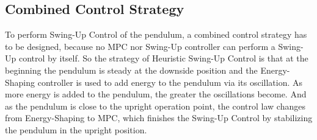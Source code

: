 \subsection{Combined Control Strategy}
To perform Swing-Up Control of the pendulum, a combined control strategy has to be designed, because no MPC nor Swing-Up controller can perform a Swing-Up control by itself. So the strategy of Heuristic Swing-Up Control is that at the beginning the pendulum is steady at the downside position and the Energy-Shaping controller is used to add energy to the pendulum via its oscillation. As more energy is added to the pendulum, the greater the oscillations become. And as the pendulum is close to the upright operation point, the control law changes from Energy-Shaping to MPC, which finishes the Swing-Up Control by stabilizing the pendulum in the upright position.
\newpage
